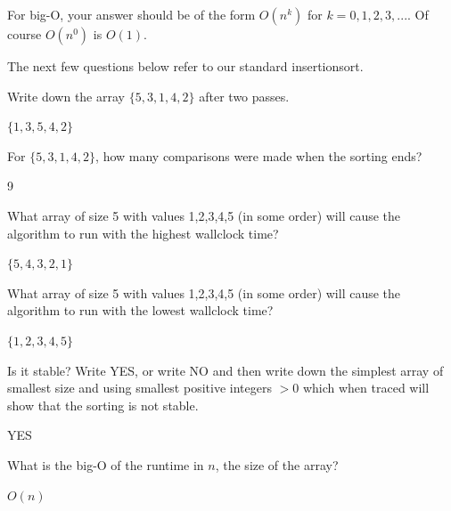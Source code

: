 

For big-O,
your answer should be of the form $O(n^k)$ for $k=0, 1, 2, 3, ...$.
Of course $O(n^0)$ is $O(1)$.

The next few questions below refer to our standard insertionsort.

\nextq
Write down the array $\{ 5, 3, 1, 4, 2 \}$ after two passes.
\\
\ANSWER
\begin{answerlong}
$\{ 1, 3, 5, 4, 2 \}$
\end{answerlong}

\nextq
For $\{ 5, 3, 1, 4, 2 \}$, how many comparisons were made when the sorting
ends?
\\
\ANSWER
\begin{answerlong}
9
\end{answerlong}

\nextq
What array of size 5 with values 1,2,3,4,5 (in some order)
will cause the algorithm to run with the highest wallclock time?
\\
\ANSWER
\begin{answerlong}
$\{ 5, 4, 3, 2, 1 \}$
\end{answerlong}

\nextq
What array of size 5 with values 1,2,3,4,5 (in some order)
will cause the algorithm to run with the lowest wallclock time?
\\
\ANSWER
\begin{answerlong}
$\{ 1, 2, 3, 4, 5 \}$
\end{answerlong}

\nextq
Is it stable?
Write YES, or write NO and then write down the simplest array
of smallest size and using smallest positive integers $> 0$
which when traced will show that the sorting is not stable.
\\
\ANSWER
\begin{answerlong}
YES
\end{answerlong}

\nextq
What is the big-O of the runtime in $n$, the size of the array?
\\
\ANSWER
\begin{answerlong}
$O(n)$
\end{answerlong}

